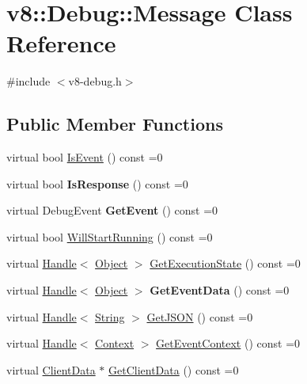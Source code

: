 \hypertarget{classv8_1_1_debug_1_1_message}{}\section{v8\+:\+:Debug\+:\+:Message Class Reference}
\label{classv8_1_1_debug_1_1_message}


{\ttfamily \#include $<$v8-\/debug.\+h$>$}

\subsection*{Public Member Functions}
\begin{DoxyCompactItemize}
\item 
virtual bool \hyperlink{classv8_1_1_debug_1_1_message_a36ade83a9c960ce581b1a4051f763785}{Is\+Event} () const =0
\item 
\hypertarget{classv8_1_1_debug_1_1_message_a1d65d6efbb5adb96406f7e285bb25ee3}{}virtual bool {\bfseries Is\+Response} () const =0\label{classv8_1_1_debug_1_1_message_a1d65d6efbb5adb96406f7e285bb25ee3}

\item 
\hypertarget{classv8_1_1_debug_1_1_message_a8a99a5c9fe0db14fbaccaed297d9c203}{}virtual Debug\+Event {\bfseries Get\+Event} () const =0\label{classv8_1_1_debug_1_1_message_a8a99a5c9fe0db14fbaccaed297d9c203}

\item 
virtual bool \hyperlink{classv8_1_1_debug_1_1_message_af8d236b6a334423732a38cbf8cfd7aef}{Will\+Start\+Running} () const =0
\item 
virtual \hyperlink{classv8_1_1_handle}{Handle}$<$ \hyperlink{classv8_1_1_object}{Object} $>$ \hyperlink{classv8_1_1_debug_1_1_message_aa54e11b06d304e8b8f34cc79ee49d869}{Get\+Execution\+State} () const =0
\item 
\hypertarget{classv8_1_1_debug_1_1_message_aa18f6c01d91d176d4e3d0a018890e59a}{}virtual \hyperlink{classv8_1_1_handle}{Handle}$<$ \hyperlink{classv8_1_1_object}{Object} $>$ {\bfseries Get\+Event\+Data} () const =0\label{classv8_1_1_debug_1_1_message_aa18f6c01d91d176d4e3d0a018890e59a}

\item 
virtual \hyperlink{classv8_1_1_handle}{Handle}$<$ \hyperlink{classv8_1_1_string}{String} $>$ \hyperlink{classv8_1_1_debug_1_1_message_a41076f64f82c927cbb2fe5c8325557d5}{Get\+J\+S\+O\+N} () const =0
\item 
virtual \hyperlink{classv8_1_1_handle}{Handle}$<$ \hyperlink{classv8_1_1_context}{Context} $>$ \hyperlink{classv8_1_1_debug_1_1_message_a34ff90d879888746a7a0eacebd6aa088}{Get\+Event\+Context} () const =0
\item 
virtual \hyperlink{classv8_1_1_debug_1_1_client_data}{Client\+Data} $\ast$ \hyperlink{classv8_1_1_debug_1_1_message_ab81bb81d233f5f37e6626a7bcac22142}{Get\+Client\+Data} () const =0
\end{DoxyCompactItemize}



